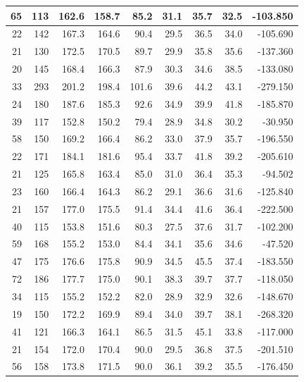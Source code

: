 \documentclass[
  ignorenonframetext,
]{beamer}
\begin{document}
\begin{frame}{}
\begin{table}
\begin{tabular}[t]{r|r|r|r|r|r|r|r|r}
\hline
65 & 113 & 162.6 & 158.7 & 85.2 & 31.1 & 35.7 & 32.5 & -103.850\\
\hline
22 & 142 & 167.3 & 164.6 & 90.4 & 29.5 & 36.5 & 34.0 & -105.690\\
\hline
21 & 130 & 172.5 & 170.5 & 89.7 & 29.9 & 35.8 & 35.6 & -137.360\\
\hline
20 & 145 & 168.4 & 166.3 & 87.9 & 30.3 & 34.6 & 38.5 & -133.080\\
\hline
33 & 293 & 201.2 & 198.4 & 101.6 & 39.6 & 44.2 & 43.1 & -279.150\\
\hline
24 & 180 & 187.6 & 185.3 & 92.6 & 34.9 & 39.9 & 41.8 & -185.870\\
\hline
39 & 117 & 152.8 & 150.2 & 79.4 & 28.9 & 34.8 & 30.2 & -30.950\\
\hline
58 & 150 & 169.2 & 166.4 & 86.2 & 33.0 & 37.9 & 35.7 & -196.550\\
\hline
22 & 171 & 184.1 & 181.6 & 95.4 & 33.7 & 41.8 & 39.2 & -205.610\\
\hline
21 & 125 & 165.8 & 163.4 & 85.0 & 31.0 & 36.4 & 35.3 & -94.502\\
\hline
23 & 160 & 166.4 & 164.3 & 86.2 & 29.1 & 36.6 & 31.6 & -125.840\\
\hline
21 & 157 & 177.0 & 175.5 & 91.4 & 34.4 & 41.6 & 36.4 & -222.500\\
\hline
40 & 115 & 153.8 & 151.6 & 80.3 & 27.5 & 37.6 & 31.7 & -102.200\\
\hline
59 & 168 & 155.2 & 153.0 & 84.4 & 34.1 & 35.6 & 34.6 & -47.520\\
\hline
47 & 175 & 176.6 & 175.8 & 90.9 & 34.5 & 45.5 & 37.4 & -183.550\\
\hline
72 & 186 & 177.7 & 175.0 & 90.1 & 38.3 & 39.7 & 37.7 & -118.050\\
\hline
34 & 115 & 155.2 & 152.2 & 82.0 & 28.9 & 32.9 & 32.6 & -148.670\\
\hline
19 & 150 & 172.2 & 169.9 & 89.4 & 34.0 & 39.7 & 38.1 & -268.320\\
\hline
41 & 121 & 166.3 & 164.1 & 86.5 & 31.5 & 45.1 & 33.8 & -117.000\\
\hline
21 & 154 & 172.0 & 170.4 & 90.0 & 29.5 & 36.8 & 37.5 & -201.510\\
\hline
56 & 158 & 173.8 & 171.5 & 90.0 & 36.1 & 39.2 & 35.5 & -176.450\\
\hline
\end{tabular}
\endgroup{}
\end{table}
\end{frame}
\end{document}
